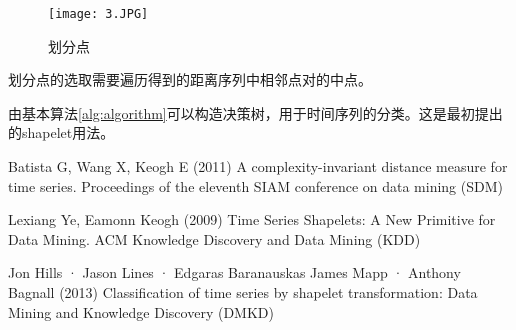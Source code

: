 ﻿\documentclass[a4paper, 11pt]{article}
\begin{document}
\begin{CJK}{UTF8}{gbsn}
\begin{figure}[htbp]
    \small
    \centering
    \texttt{[image: 3.JPG]}
    \label{fig:fig3}
    \caption{划分点}
\end{figure}

划分点的选取需要遍历得到的距离序列中相邻点对的中点。\par

由基本算法\ref{alg:algorithm}可以构造决策树，用于时间序列的分类。这是最初提出的shapelet用法。\par

\newpage
\begin{thebibliography}{}
 Batista G, Wang X, Keogh E (2011) A complexity-invariant distance measure for time series. Proceedings of the eleventh SIAM conference on data mining (SDM)

 Lexiang Ye, Eamonn Keogh (2009) Time Series Shapelets: A New Primitive for Data Mining. ACM Knowledge Discovery and Data Mining (KDD)

 Jon Hills · Jason Lines · Edgaras Baranauskas James Mapp · Anthony Bagnall (2013) Classification of time series by shapelet transformation: Data Mining and Knowledge
Discovery (DMKD)
\end{thebibliography}

\end{CJK}
\end{document}
